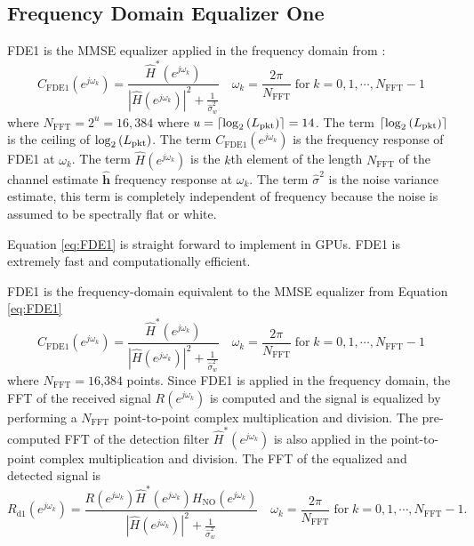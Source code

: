 \subsection{Frequency Domain Equalizer One}
FDE1 is the MMSE equalizer applied in the frequency domain from \cite[eq. (11)]{williams2013linear}:
\begin{equation}
C_\text{FDE1}(e^{j\omega_k}) = \frac{\hat{H}^\ast(e^{j\omega_k})}  {|\hat{H}(e^{j\omega_k})|^2  +  \frac{1}{\hat{\sigma}^2_w}} \quad
\omega_k = \frac{2\pi}{N_\text{FFT}} \;
\text{for} \;
k=0,1,\cdots,N_\text{FFT}-1
\label{eq:FDE1}
\end{equation}
where $N_\text{FFT} = 2^u = 16{,}384$ where $u = {\left\lceil \log_2{\left(L_\text{pkt}\right)}  \right\rceil} = 14$.
The term ${\left\lceil \log_2{\left(L_\text{pkt}\right)}  \right\rceil}$ is the ceiling of $\log_2{\left(L_\text{pkt}\right)}$.
The term $C_\text{FDE1}(e^{j\omega_k})$ is the frequency response of FDE1 at $\omega_k$.
The term $\hat{H}(e^{j\omega_k})$ is the $k$th element of the length $N_\text{FFT}$ of the channel estimate $\mathbf{\hat{h}}$ frequency response at $\omega_k$.
The term $\hat{\sigma}^2$ is the noise variance estimate, this term is completely independent of frequency because the noise is assumed to be spectrally flat or white.

Equation \eqref{eq:FDE1} is straight forward to implement in GPUs.
FDE1 is extremely fast and computationally efficient.




FDE1 is the frequency-domain equivalent to the MMSE equalizer from Equation \eqref{eq:FDE1}
\begin{equation}
C_\text{FDE1}(e^{j\omega_k}) = \frac{\hat{H}^\ast(e^{j\omega_k})}  {|\hat{H}(e^{j\omega_k})|^2  +  \frac{1}{\hat{\sigma}^2_w}} \quad
\omega_k = \frac{2\pi}{N_\text{FFT}} \;
\text{for} \;
k=0,1,\cdots,N_\text{FFT}-1
\label{eq:FDE1_imp}
\end{equation}
where $N_\text{FFT} = 16$,$384$ points. Since FDE1 is applied in the frequency domain, the FFT of the received signal $R(e^{j\omega_k})$ is computed and the signal is equalized by performing a $N_\text{FFT}$ point-to-point complex multiplication and division.
The pre-computed FFT of the detection filter $\hat{H}^\ast(e^{j\omega_k})$ is also applied in the point-to-point complex multiplication and division.
The FFT of the equalized and detected signal is
\begin{equation}
R_\text{d1}(e^{j\omega_k}) = \frac{R(e^{j\omega_k}) \hat{H}^\ast(e^{j\omega_k}) H_{\text{NO}}(e^{j\omega_k})}  {|\hat{H}(e^{j\omega_k})|^2  +  \frac{1}{\hat{\sigma}^2_w}} \quad
\omega_k = \frac{2\pi}{N_\text{FFT}} \;
\text{for} \;
k=0,1,\cdots,N_\text{FFT}-1.
\label{eq:FDE1_applied}
\end{equation}



